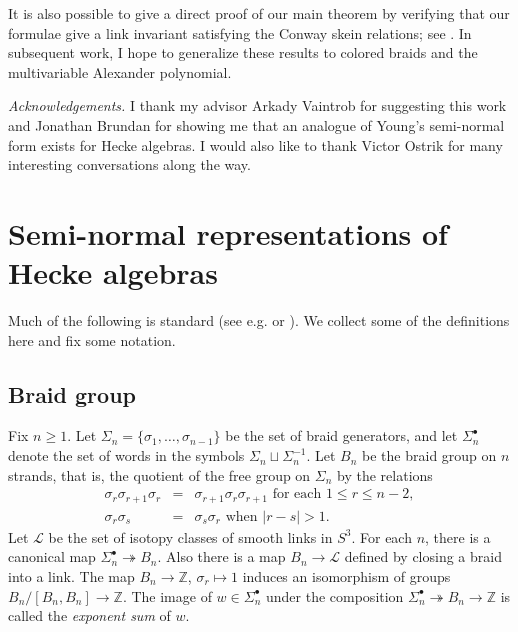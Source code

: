 \documentclass [12pt, letterpaper, oneside] {amsart}
\newcommand \onto {\twoheadrightarrow}
\newcommand \s {\sigma}
\newcommand \mc {\mathcal}
\newcommand \mB {\mathbb}
\theoremstyle {plain}
\begin{document}
It is also possible to give a direct proof of our main theorem by verifying that our formulae give a link invariant satisfying the Conway skein relations; see \cite {Black}.  In subsequent work, I hope to generalize these results to colored braids and the multivariable Alexander polynomial.

\emph {Acknowledgements.}  I thank my advisor Arkady Vaintrob for suggesting this work and Jonathan Brundan for showing me that an analogue of Young's semi-normal form exists for Hecke algebras.  I would also like to thank Victor Ostrik for many interesting conversations along the way.

\section {Semi-normal representations of Hecke algebras} \label {sec s-n}

Much of the following is standard (see e.g. \cite {CurtisReiner} or 
\cite [chapters 4 and 5] {KasTur}).  We collect some of the definitions here and fix some notation.

\subsection {Braid group}
Fix $n \geq 1$. Let $\Sigma_n = \{ \s_1, \ldots, \s_{n-1} \} $ be the set of braid generators, and let $\Sigma_n^\bullet$ denote the set of words in the symbols $\Sigma_n \sqcup \Sigma_n^{-1}$.
Let $B_n$ be the braid group on $n$ strands, that is, the quotient of the free group on $\Sigma_n$ by the relations
\begin {eqnarray*}
    \s_r \s_{r+1} \s_r &=& \s_{r+1} \s_r \s_{r+1} \text { for each } 1 \le r \le n-2, \\
    \s_r \s_s &=& \s_s \s_r \text { when } |r - s| > 1.
\end {eqnarray*}
Let $\mc{L}$ be the set of isotopy classes of smooth links in $S^3$.  For each 
$n$, there is a canonical map
$\Sigma_n^\bullet \onto B_n$. Also there is a map
$B_n \rightarrow \mc{L}$ defined by closing a braid into a link.
The map $B_n \to \mB{Z}$, $\s_r \mapsto 1$ induces an isomorphism of groups $B_n / [B_n, B_n] \to \mB{Z}$.  The image of $w \in \Sigma_n^\bullet$ under the composition $\Sigma_n^\bullet \onto B_n \to \mB{Z}$ is called the \emph {exponent sum} of $w$. 
\end{document}

